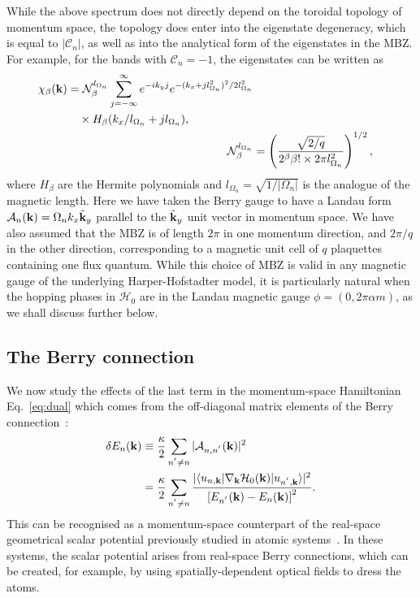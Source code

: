 While the above spectrum does not directly depend on the toroidal
topology of momentum space, the topology does enter into the
eigenstate degeneracy, which is equal to $|\mathcal{C}_n|$, as well as
into the analytical form of the eigenstates in the MBZ. For example,
for the bands with $\mathcal{C}_n = -1$, the eigenstates can be
written as~\cite{price2014magnetic}
%
\begin{align}\label{eq:chi}
\begin{split} \chi_\beta (\mathbf{k}) &= \mathcal{N}_\beta^{l_{\Omega_n}}
\sum_{j = - \infty}^{\infty} e^{- i k_y j } e^{ - ( k_x + j
l_{\Omega_n}^2 ) ^2 / 2 l_{\Omega_n}^2}\\ &\quad \times H_\beta ( k_x
/ l_{\Omega_n} + j l_{\Omega_n}) ,
\end{split}\\ \mathcal{N}_\beta^{l_{\Omega_n}} &= \left(
\frac{\sqrt{2/q}} {2^\beta\beta! \times 2 \pi l_{\Omega_n}^2}
\right)^{1/2} ,
\end{align}
% 
where $H_\beta$ are the Hermite polynomials and $l_{\Omega_n} =
\sqrt{1/|\Omega_n|}$ is the analogue of the magnetic length. Here we
have taken the Berry gauge to have a Landau form
$\mathcal{A}_n(\mathbf{k}) = \Omega_n k_x \hat{\mathbf{k}}_y$ parallel to
the $\hat{\mathbf{k}}_y$ unit vector in momentum space. We have also
assumed that the MBZ is of length $2 \pi$ in one momentum direction,
and $2 \pi / q$ in the other direction, corresponding to a magnetic
unit cell of $q$ plaquettes containing one flux quantum. While this
choice of MBZ is valid in any magnetic gauge of the underlying
Harper-Hofstadter model, it is particularly natural when the hopping
phases in $\mathcal{H}_0$ are in the Landau magnetic gauge $\phi = (0,
2\pi\alpha m)$, as we shall discuss further below.


\subsection{The Berry connection}\label{sec:berry-shift}

We now study the effects of the last term in the momentum-space
Hamiltonian Eq.~\eqref{eq:dual} which comes from the off-diagonal matrix
elements of the Berry connection~\cite{berry}:
\begin{align} \delta E_n(\mathbf{k}) &\equiv
\frac{\kappa}{2}\sum_{n^{'}\neq n}
\vert \mathcal{A}_{n,n^{'}}(\mathbf{k}) \vert^2 \notag \\ &=
\frac{\kappa}{2}\sum_{n^{'}\neq n}
\frac{\vert \langle u_{n,\mathbf{k}} \vert\nabla_{\mathbf{k}}\mathcal{H}_0(\mathbf{k})\vert u_{n^{'},\mathbf{k}} \rangle \vert^2}{\left[E_{n^{'}}(\mathbf{k})
- E_{n}(\mathbf{k})\right]^2}.
  \label{eq:shift}
\end{align} This can be recognised as a momentum-space counterpart of
the real-space geometrical scalar potential previously studied in
atomic systems~\cite{dum:1996, dutta:1999, dalibardrmp2011}. In these
systems, the scalar potential arises from real-space Berry
connections, which can be created, for example, by using
spatially-dependent optical fields to dress the atoms.
 
